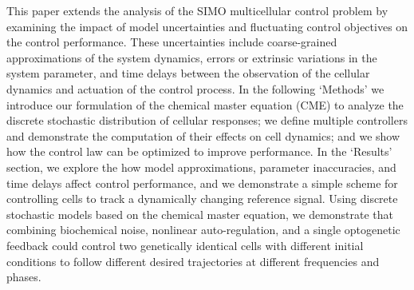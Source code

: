\documentclass[12pt]{iopart}
\begin{document}
This paper extends the analysis of the SIMO multicellular control problem by examining the impact of model uncertainties and fluctuating control objectives on the control performance. 
These uncertainties include coarse-grained approximations of the system dynamics, errors or extrinsic variations in the system parameter, and time delays between the observation of the cellular dynamics and actuation of the control process. 
In the following `Methods' we introduce our formulation of the chemical master equation (CME) to analyze the discrete stochastic distribution of cellular responses; we define multiple controllers and demonstrate the computation of their effects on cell dynamics; and we show how the control law can be optimized to improve performance.
In the `Results' section, we explore the how model approximations, parameter inaccuracies, and time delays affect control performance, and we demonstrate a simple scheme for controlling cells to track a dynamically changing reference signal. 
Using discrete stochastic models based on the chemical master equation, we demonstrate that combining biochemical noise, nonlinear auto-regulation, and a single optogenetic feedback could control two genetically identical cells with different initial conditions to follow different desired trajectories at different frequencies and phases. 
\end{document}
